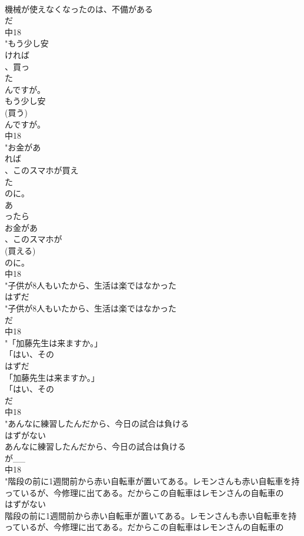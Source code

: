 \documentclass[8pt]{extreport}
\begin{document}
\begin{CJK}{UTF8}{min}
\\	機械が使えなくなったのは、不備がある
\\	だ
\\	中18
\\	"もう少し安
\\	ければ
\\	、買っ
\\	た
\\	んですが。
\\	もう少し安
\\	(買う)
\\	んですが。
\\	中18
\\	"お金があ
\\	れば
\\	、このスマホが買え
\\	た
\\	のに。
\\	あ
\\	ったら
\\	お金があ
\\	、このスマホが
\\	(買える)
\\	のに。
\\	中18
\\	"子供が8人もいたから、生活は楽ではなかった
\\	はずだ
\\	"子供が8人もいたから、生活は楽ではなかった
\\	だ
\\	中18
\\	"「加藤先生は来ますか。」
\\	「はい、その
\\	はずだ
\\	「加藤先生は来ますか。」
\\	「はい、その
\\	だ
\\	中18
\\	"あんなに練習したんだから、今日の試合は負ける
\\	はずがない
\\	あんなに練習したんだから、今日の試合は負ける
\\	が__
\\	中18
\\	"階段の前に1週間前から赤い自転車が置いてある。レモンさんも赤い自転車を持っているが、今修理に出てある。だからこの自転車はレモンさんの自転車の
\\	はずがない
\\	階段の前に1週間前から赤い自転車が置いてある。レモンさんも赤い自転車を持っているが、今修理に出てある。だからこの自転車はレモンさんの自転車の

\end{CJK}
\end{document}
